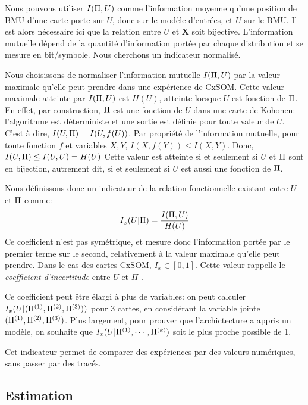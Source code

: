 Nous pouvons utiliser $I(\Pi, U)$ comme l'information moyenne qu'une position de BMU d'une carte porte sur $U$, donc sur le modèle d'entrées, et $U$ sur le BMU.  Il est alors nécessaire ici que la relation entre $U$ et $\mathbf{X}$ soit bijective.
L'information mutuelle dépend de la quantité d'information portée par chaque distribution et se mesure en bit/symbole. Nous cherchons un indicateur normalisé.


Nous choisissons de normaliser l'information mutuelle $I(\Pi,U)$  par la valeur maximale qu'elle peut prendre dans une expérience de CxSOM. Cette valeur maximale atteinte par $I(\Pi,U)$ est $H(U)$, atteinte lorsque $U$ est fonction de $\Pi$.
En effet, par construction, $\Pi$ est une fonction de $U$ dans une carte de Kohonen: l'algorithme est déterministe et une sortie est définie pour toute valeur de $U$. C'est à dire, $I(U,\Pi) = I (U, f(U))$.
Par propriété de l'information mutuelle, pour toute fonction $f$ et variables $X,Y$, $I(X,f(Y)) \leq I(X,Y) $. 
Donc, $I(U,\Pi) \leq I(U,U) = H(U)$
Cette valeur est atteinte si et seulement si $U$ et $\Pi$ sont en bijection, autrement dit, si et seulement si $U$ est aussi une fonction de $\Pi$.

Nous définissons donc un indicateur de la relation fonctionnelle existant entre $U$ et $\Pi$ comme:
\begin{equation}
I_x(U|\Pi) = \frac{I(\Pi,U)}{H(U)}
\end{equation}
Ce coefficient n'est pas symétrique, et mesure donc l'information portée par le premier terme sur le second, relativement à la valeur maximale qu'elle peut prendre. Dans le cas des cartes CxSOM, $I_x \in [0,1]$. Cette valeur rappelle le \emph{coefficient d'incertitude} entre $U$ et $\Pi$ \cite{Theil1961EconomicFA}.



Ce coefficient peut être élargi à plus de variables: on peut calculer $I_x(U | (\Pi^{({1})},\Pi^{({2})},\Pi^{({3})}))$ pour 3 cartes, en considérant la variable jointe $(\Pi^{({1})},\Pi^{({2})},\Pi^{({3})})$.
Plus largement, pour prouver que l'archictecture a appris un modèle, on souhaite que $I_x(U|\Pi^{({1})},\cdots,\Pi^{({k})})$ soit le plus proche possible de 1.

Cet indicateur permet de comparer des expériences par des valeurs numériques, sans passer par des tracés.

\subsection{Estimation}

